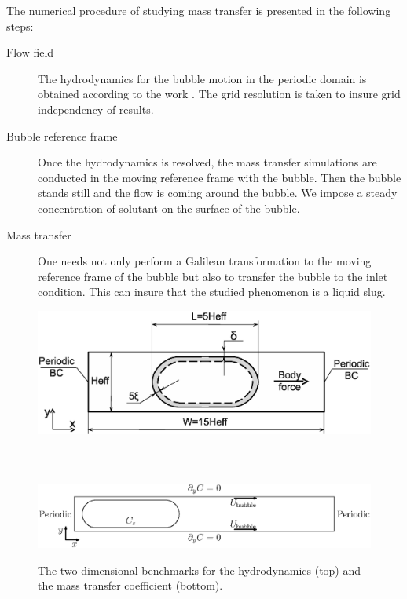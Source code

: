 \documentclass{article}
\begin{document}
The numerical  procedure of studying mass transfer is presented in the following steps:
\begin{description}
 \item[Flow field] The hydrodynamics for the bubble motion in the periodic domain is obtained
according to the work \cite{kuzmin-binary2d}. The grid resolution is taken to insure grid
independency of results.  
 \item[Bubble reference frame] Once the hydrodynamics is resolved, the mass transfer simulations
are conducted in the moving
reference frame with the bubble. Then the bubble stands still and the flow is coming around the
bubble. We impose a steady concentration of solutant on the surface of the bubble.
\item[Mass transfer] One needs not only perform a Galilean transformation to the moving reference
frame of the bubble but also to
transfer the bubble to the inlet condition. This can insure that the studied phenomenon is a liquid
slug. 
\end{description}
\begin{figure}[htb!]
\includegraphics[width=\textwidth]{Figures/benchmark_new.eps}\\
\\
\\
\\
\includegraphics[width=\textwidth]{Figures/benchmark_periodic.eps}
\caption{The two-dimensional benchmarks for the hydrodynamics (top) and the mass transfer
coefficient (bottom). \label{fig:benchmark}}
\end{figure}
\end{document}
